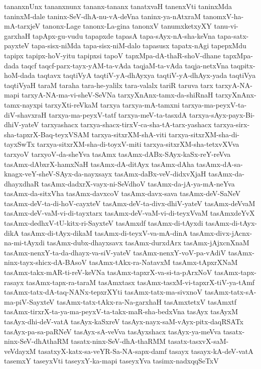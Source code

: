 {tananxnUnx
tananxnunx
tananx-tananx
tanatxvaH
tanenxVti
taninxMda
taninxM-dale
taninx-SeV-dhA-nu-vA-deVna
taninx-ya-nAtxraM
tanomxV-ha-mA-tarxjeV
tanonx-Lage
tanonx-La-gina
tanonxV
tanumxketxyXY
tanu-vi-garxhaH
tapApx-gu-vudu
tapapxde
tapasA
tapa-sAyx-nA-sha-keVna
tapa-satx-payxteV
tapa-sisx-niMda
tapa-sisx-niM-dalo
tapasusx
tapatx-nAgi
tapepxMdu
tapipx
tapipx-hoV-yitu
tapipxsi
tapoV
tapxMpa-dA-thaR-shoV-dhane
tapxMpa-dada
taqcf
taqcf-parx-tayx-yAM-ta-vAda
taqjaM-ta-vAda
taqja-netxVna
taqpitx-hoM-dada
taqtavx
taqtiVyA
taqtiV-yA-dhAyxya
taqtiV-yA-dhAyx-yada
taqtiVya
taqtiVyaH
taraM
taraha
tara-he-yalilx
tara-valalx
tariR
taruva
tarx
tarxyA-NA-mapi
tarxyA-NA-ma-vi-sheV-SeVNa
tarxyXnAnx-tamx-da-shiRnaH
tarxyXnAnx-tamx-nayxpi
tarxyXti-reVkaM
tarxya
tarxya-mA-tamxni
tarxya-ma-peyxV-ta-diV-shavxraH
tarxya-ma-peyxV-tatf
tarxya-meV-ta-tasxdA
tarxya-sAyx-payx-Bi-dhiV-yateV
tarxyashacx
tarxya-shacx-tirxV-ca-sha-tA-tarx-yashacx
tarxya-sirx-sha-tapxrX-Baq-teyxVSAM
tarxya-sitxrXM-shA-viti
tarxya-sitxrXM-sha-di-tayxSwTx
tarxya-sitxrXM-sha-di-toyxV-miti
tarxya-sitxrXM-sha-tetxvXVva
tarxyoV
tarxyoV-da-sheYva
tasAmx
tasAmx-dABx-SAyx-kaSx-reY-reVva
tasAmx-dAbxrX-hamxNaH
tasAmx-dA-ditAyx
tasAmx-dAha
tasAmx-dA-sa-knagx-veY-sheV-SAyx-da-nayxsayx
tasAmx-daBx-veV-didxvXjaH
tasAmx-da-dhayxdhaR
tasAmx-dadxrX-vayx-ni-SeVdhoV
tasAmx-da-jA-ya-mA-neYva
tasAmx-da-sitxVha
tasAmx-davxcoV
tasAmx-davx-sava
tasAmx-deV-SaNeV
tasAmx-deV-ta-di-hoV-cayxteV
tasAmx-deV-ta-divx-dhiV-yateV
tasAmx-deVvaM
tasAmx-deV-vaM-vi-di-tayxtarx
tasAmx-deV-vaM-vi-di-teyxVvaM
tasAmxdeYvX
tasAmx-dedhxV-tU-kitx-ri-SayxteV
tasAmxdf
tasAmx-di-tAyxdi
tasAmx-di-tAyx-dikA
tasAmx-di-tAyx-dikaM
tasAmx-di-teyxV-va-mA-dinA
tasAmx-divx-jAcnx-na-mi-tAyxdi
tasAmx-dubx-dhayxsavx
tasAmx-durxdArx
tasAmx-jAjxcnXnaM
tasAmx-nenxY-ta-da-dhayx-va-siV-yateV
tasAmx-nenxY-voV-pa-vAdiV
tasAmx-ninx-tayx-shicx-dA-BAsoV
tasAmx-tAkx-ra-NatavxM
tasAmx-tApxrXNaM
tasAmx-takx-mAR-ti-reV-keVNa
tasAmx-tapxrX-va-si-ta-pArxNoV
tasAmx-tapx-rasayx
tasAmx-tapx-ra-taraM
tasAmxtasx
tasAmx-tasxM-vi-tapxrX-tiV-ya-tAmf
tasAmx-tatx-dA-taq-NANx-tepxrXYti
tasAmx-tatx-ma-sivxnoV
tasAmx-tatx-sA-ma-piV-SayxteV
tasAmx-tatx-tAkx-ra-Na-garxhaH
tasAmxtetxV
tasAmxtf
tasAmx-tirxrX-ta-ya-ma-peyxV-ta-takx-maR-sha-bedxVna
tasAyx
tasAyxM
tasAyx-dhi-deV-vatA
tasAyx-kaSxreV
tasAyx-nayx-saM-vAyx-pitx-daqRSATx
tasAyx-pa-sa-paRNeV
tasAyx-sA-veVva
tasAyxshacx
tasAyx-ya-meVva
tasatx-ninx-SeV-dhAthaRM
tasatx-ninx-SeV-dhA-thaRMM
tasatx-tasxvX-saM-veVdayxM
tasatxyX-katx-sa-veYR-Sa-NA-sapx-damf
tasayx
tasayx-kA-deV-vatA
tasemxY
taseyxVti
taseyxY-ka-mapi
taseyxYva
tasimx-nadxqqSeTxV
}
